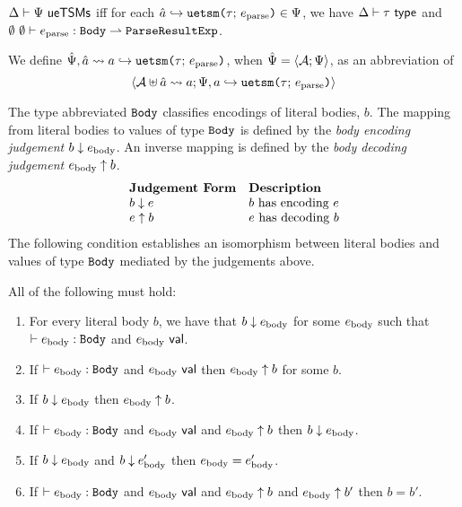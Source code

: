 {{{{\begin{definition}\label{def:ueTSM-def-ctx-formation-UP} $\Delta \vdash \Psi~\mathsf{ueTSMs}$ iff for each $\hat{a} \hookrightarrow \texttt{uetsm}\texttt{(}\tau;\,e_\text{parse}\texttt{)} \in \Psi$, we have $\Delta \vdash \tau~\mathsf{type}$ and $\emptyset~\emptyset \vdash e_\text{parse} : \mathtt{Body} \rightharpoonup \mathtt{ParseResultExp}$.\end{definition}

We define $\hat{\Psi}, \hat{a} \leadsto a \hookrightarrow \texttt{uetsm}\texttt{(}\tau;\,e_\text{parse}\texttt{)}$, when $\hat{\Psi}=\langle \mathcal{A}; \Psi \rangle$, as an abbreviation of \[\langle \mathcal{A} \uplus \hat{a} \leadsto a; \Psi, a \hookrightarrow \texttt{uetsm}\texttt{(}\tau;\,e_\text{parse}\texttt{)} \rangle\]

The type abbreviated $\mathtt{Body}$ classifies encodings of literal bodies, $b$. The mapping from literal bodies to values of type $\mathtt{Body}$ is defined by the \emph{body encoding judgement} $b \downarrow e_\text{body}$. An inverse mapping is defined   by the \emph{body decoding judgement} $e_\text{body} \uparrow b$.
\[\begin{array}{ll}
\textbf{Judgement Form} & \textbf{Description}\\
b \downarrow e & \text{$b$ has encoding $e$}\\
e \uparrow b & \text{$e$ has decoding $b$}
\end{array}\]
The following condition establishes an isomorphism between literal bodies and values of type $\mathtt{Body}$ mediated by the judgements above.
\begin{condition} All of the following must hold:
\begin{enumerate}
\item For every literal body $b$, we have that $b \downarrow e_\text{body}$ for some $e_\text{body}$ such that $\vdash e_\text{body} : \mathtt{Body}$ and $e_\text{body}~\mathsf{val}$.
\item If $\vdash e_\text{body} : \mathtt{Body}$ and $e_\text{body}~\mathsf{val}$ then $e_\text{body} \uparrow b$ for some $b$.
\item If $b \downarrow e_\text{body}$ then $e_\text{body} \uparrow b$.
\item If $\vdash e_\text{body} : \mathtt{Body}$ and $e_\text{body}~\mathsf{val}$ and $e_\text{body} \uparrow b$ then $b \downarrow e_\text{body}$. 
\item If $b \downarrow e_\text{body}$ and $b \downarrow e_\text{body}'$ then $e_\text{body} = e_\text{body}'$.
\item If $\vdash e_\text{body} : \mathtt{Body}$ and $e_\text{body}~\mathsf{val}$ and $e_\text{body} \uparrow b$ and $e_\text{body} \uparrow b'$ then $b=b'$.
\end{enumerate}
\end{condition}

}}}}
